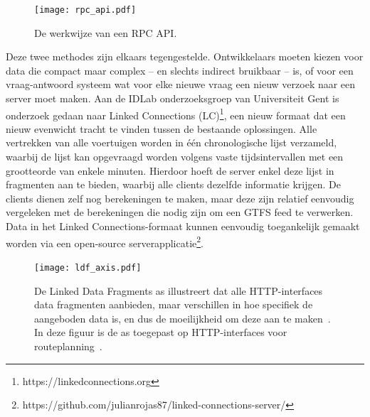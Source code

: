 \begin{figure}
	\centering
	\texttt{[image: rpc\_api.pdf]}
	\caption[RPC structuur]{De werkwijze van een RPC API.}
	\label{fig:rpcScheme}
\end{figure}

Deze twee methodes zijn elkaars tegengestelde. Ontwikkelaars moeten kiezen voor data die compact maar complex -- en slechts indirect bruikbaar -- is, of voor een vraag-antwoord systeem wat voor elke nieuwe vraag een nieuw verzoek naar een server moet maken. Aan de IDLab onderzoeksgroep van Universiteit Gent is onderzoek gedaan naar Linked Connections (LC)\footnote{https://linkedconnections.org}, een nieuw formaat dat een nieuw evenwicht tracht te vinden tussen de bestaande oplossingen. Alle vertrekken van alle voertuigen worden in één chronologische lijst verzameld, waarbij de lijst kan opgevraagd worden volgens vaste tijdsintervallen met een grootteorde van enkele minuten. Hierdoor hoeft de server enkel deze lijst in fragmenten aan te bieden, waarbij alle clients dezelfde informatie krijgen. De clients dienen zelf nog berekeningen te maken, maar deze zijn relatief eenvoudig vergeleken met de berekeningen die nodig zijn om een GTFS feed te verwerken. Data in het Linked Connections-formaat kunnen eenvoudig toegankelijk gemaakt worden via een open-source serverapplicatie\footnote{https://github.com/julianrojas87/linked-connections-server/}.

\begin{figure}
	\centering
		\texttt{[image: ldf\_axis.pdf]}
	\caption[Routeplanning HTTP-interfaces op de LDF as]{De Linked Data Fragments as illustreert dat alle HTTP-interfaces data fragmenten aanbieden, maar verschillen in hoe specifiek de aangeboden data is, en dus de moeilijkheid om deze aan te maken~\citep{verborgh14}. In deze figuur is de as toegepast op HTTP-interfaces voor routeplanning~\citep{colpaert15}.}
	\label{fig:ldfAxis}
\end{figure}

